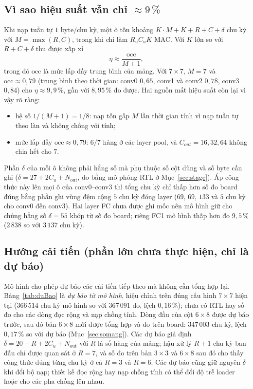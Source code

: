 \subsection{Vì sao hiệu suất vẫn chỉ $\approx9\,\%$}
Khi nạp tuần tự $1$ byte/chu kỳ, một ô tốn khoảng $K\cdot M+K+R+C+\delta$ chu kỳ với $M=\max(R,C)$, trong khi chỉ làm $R_uC_uK$ MAC.
Với $K$ lớn so với $R+C+\delta$ thu được xấp xỉ
\begin{equation}\label{eq:eta-approx}
  \eta\approx\frac{\mathrm{occ}}{M+1},
\end{equation}
trong đó $\mathrm{occ}$ là mức lấp đầy trung bình của mảng.
Với $7\times7$, $M=7$ và $\mathrm{occ}\approx0{,}79$ (trung bình theo thời gian: conv0 $0{,}65$, conv1 và conv2 $0{,}78$, conv3 $0{,}84$) cho $\eta\approx9{,}9\,\%$, gần với $8{,}95\,\%$ đo được.
Hai nguồn mất hiệu suất còn lại vì vậy rõ ràng:
\begin{itemize}
  \item hệ số $1/(M+1)=1/8$: nạp tốn gấp $M$ lần thời gian tính vì nạp tuần tự theo làn và không chồng với tính;
  \item mức lấp đầy $\mathrm{occ}\approx0{,}79$: $6/7$ hàng ở các layer pool, và $C_{out}=16,32,64$ không chia hết cho $7$.
\end{itemize}
Phần $\delta$ của mỗi ô không phải hằng số mà phụ thuộc số cột dùng và số byte cần ghi ($\delta=27+2C_u+N_{\text{out}}$, đo bằng mô phỏng RTL ở Mục~\ref{sec:stage}).
Áp công thức này lên mọi ô của conv0--conv3 thì tổng chu kỳ chỉ thấp hơn số đo board đúng bằng phần ghi vùng đệm cộng $5$ chu kỳ đóng layer ($69$, $69$, $133$ và $5$ chu kỳ cho conv0 đến conv3).
Hai layer FC chưa được ghi mốc nên mô hình giữ cho chúng hằng số $\delta=55$ khớp từ số đo board; riêng FC1 mô hình thấp hơn đo $9{,}5\,\%$ ($2\,838$ so với $3\,137$ chu kỳ).

\subsection{Hướng cải tiến (phần lớn chưa thực hiện, chỉ là dự báo)}
Mô hình cho phép dự báo các cải tiến tiếp theo mà không cần tổng hợp lại.
Bảng~\ref{tab:duBao} là \emph{dự báo từ mô hình}, hiệu chỉnh trên đúng cấu hình $7\times7$ hiện tại ($366\,514$ chu kỳ mô hình so với $367\,091$ đo, lệch $0{,}16\,\%$); chưa có RTL hay số đo cho các dòng đọc rộng và nạp chồng tính.
Dòng đầu của cột $6\times8$ được dự báo trước, sau đó bản $6\times8$ mới được tổng hợp và đo trên board: $347\,003$ chu kỳ, lệch $0{,}17\,\%$ so với dự báo (Mục~\ref{sec:somang}).
Các dự báo giả định $\delta=20+R+2C_u+N_{\text{out}}$ với $R$ là số hàng của mảng; hậu xử lý $R+1$ chu kỳ ban đầu chỉ được quan sát ở $R=7$, và số đo trên bản $3\times3$ và $6\times8$ sau đó cho thấy công thức đúng từng chu kỳ ở cả $R=3$ và $R=6$.
Các dự báo cũng giữ nguyên $\delta$ khi đổi bộ nạp; thiết kế đọc rộng hay nạp chồng tính có thể đổi độ trễ loader hoặc cho các pha chồng lên nhau.

